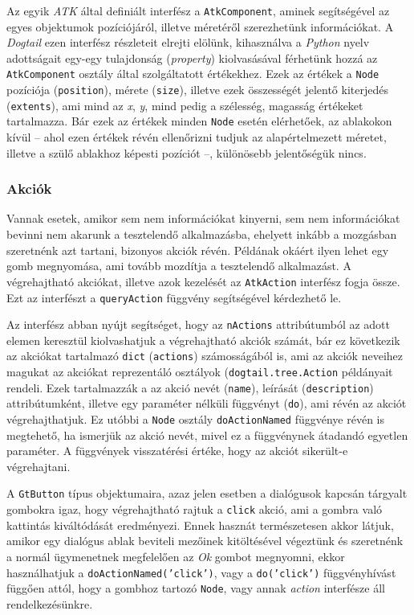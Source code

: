 Az egyik \textit{ATK} által definiált interfész a \texttt{AtkComponent}, aminek segítségével az egyes objektumok pozíciójáról, illetve méretéről szerezhetünk információkat. A \textit{Dogtail} ezen interfész részleteit elrejti elölünk, kihasználva a \textit{Python} nyelv adottságait egy-egy tulajdonság (\textit{property}) kiolvasásával férhetünk hozzá az \texttt{AtkComponent} osztály által szolgáltatott értékekhez. Ezek az értékek a \texttt{Node} pozíciója (\texttt{position}), mérete (\texttt{size}), illetve ezek összességét jelentő kiterjedés (\texttt{extents}), ami mind az \textit{x}, \textit{y}, mind pedig a szélesség, magasság értékeket tartalmazza. Bár ezek az értékek minden \texttt{Node} esetén elérhetőek, az ablakokon kívül -- ahol ezen értékek révén ellenőrizni tudjuk az alapértelmezett méretet, illetve a szülő ablakhoz képesti pozíciót --, különösebb jelentőségük nincs.

\subsubsection{Akciók}

Vannak esetek, amikor sem nem információkat kinyerni, sem nem információkat bevinni nem akarunk a tesztelendő alkalmazásba, ehelyett inkább a mozgásban szeretnénk azt tartani, bizonyos akciók révén. Példának okáért ilyen lehet egy gomb megnyomása, ami tovább mozdítja a tesztelendő alkalmazást. A végrehajtható akciókat, illetve azok kezelését az \texttt{AtkAction} interfész fogja össze. Ezt az interfészt a \texttt{queryAction} függvény segítségével kérdezhető le.

Az interfész abban nyújt segítséget, hogy az \texttt{nActions} attribútumból az adott elemen keresztül kiolvashatjuk a végrehajtható akciók számát, bár ez következik az akciókat tartalmazó \texttt{dict} (\texttt{actions}) számosságából is, ami az akciók neveihez magukat az akciókat reprezentáló osztályok (\texttt{dogtail.tree.Action} példányait rendeli. Ezek tartalmazzák a az akció nevét (\texttt{name}), leírását (\texttt{description}) attribútumként, illetve egy paraméter nélküli függvényt (\texttt{do}), ami révén az akciót végrehajthatjuk. Ez utóbbi a \texttt{Node} osztály \texttt{doActionNamed} függvénye révén is megtehető, ha ismerjük az akció nevét, mivel ez a függvénynek átadandó egyetlen paraméter. A függvények visszatérési értéke, hogy az akciót sikerült-e végrehajtani.

A \texttt{GtButton} típus objektumaira, azaz jelen esetben a dialógusok kapcsán tárgyalt gombokra igaz, hogy végrehajtható rajtuk a \texttt{click} akció, ami a gombra való kattintás kiváltódását eredményezi. Ennek hasznát természetesen akkor látjuk, amikor egy dialógus ablak beviteli mezőinek kitöltésével végeztünk és szeretnénk a normál ügymenetnek megfelelően az \textit{Ok} gombot megnyomni, ekkor használhatjuk a \texttt{doActionNamed('click')}, vagy a \texttt{do('click')} függvényhívást függően attól, hogy a gombhoz tartozó \texttt{Node}, vagy annak \textit{action} interfésze áll rendelkezésünkre.

